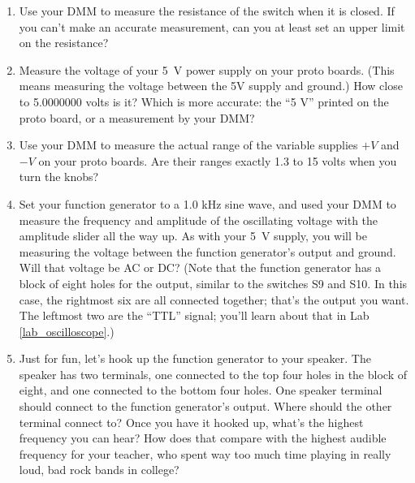 \begin{enumerate}
\item Use your DMM to measure the resistance of the switch when it is closed.  If you can't make an accurate measurement, can you at least set an upper limit on the resistance? 

\item Measure the voltage of your 5~V power supply on your proto boards.  (This means measuring the voltage between the 5V supply and ground.)  How close to 5.0000000 volts is it?  Which is more accurate: the ``5 V'' printed on the proto board, or a measurement by your DMM?

\item Use your DMM to measure the actual range of the variable supplies $+V$ and $-V$ on your proto boards.  Are their ranges exactly 1.3 to 15 volts when you turn the knobs?

\item Set your function generator to a 1.0 kHz sine wave, and used your DMM to measure the frequency and amplitude of the oscillating voltage with the amplitude slider all the way up.   As with your 5~V supply, you will be measuring the voltage between the function generator's output and ground.  Will that voltage be AC or DC?  (Note that the function generator has a block of eight holes for the output, similar to the switches S9 and S10.  In this case, the rightmost six are all connected together; that's the output you want.  The leftmost two are the ``TTL'' signal; you'll learn about that in Lab \ref{lab_oscilloscope}.)

\item Just for fun, let's hook up the function generator to your speaker.  The speaker has two terminals, one connected to the top four holes in the block of eight, and one connected to the bottom four holes.  One speaker terminal should connect to the function generator's output.  Where should the other terminal connect to?  Once you have it hooked up, what's the highest frequency you can hear?  How does that compare with the highest audible frequency for your teacher, who spent way too much time playing in really loud, bad rock bands in college?
 
\end{enumerate}




